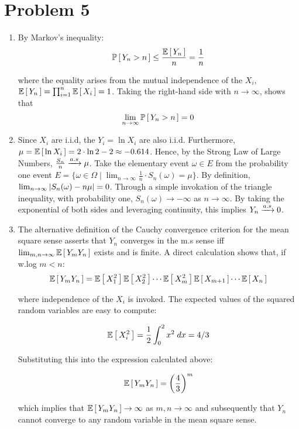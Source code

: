 \documentclass[12pt]{article}%
\begin{document}
\section{Problem 5}
\begin{enumerate}
  \item By Markov's inequality:
  \[ \mathbb{P}\left[\,Y_n > n\,\right] \leq \frac{\mathbb{E}\left[\,Y_n\,\right]}{n} = \frac{1}{n} \]

  where the equality arises from the mutual independence of the $X_i$, $\mathbb{E}\left[\,Y_n\,\right] = \prod_{i=1}^{n} \mathbb{E}\left[\,X_i\,\right] = 1$. Taking the right-hand side with $n \rightarrow \infty$, shows that
  \[ \lim_{n \rightarrow \infty} \mathbb{P}\left[\,Y_n > n\,\right] = 0  \]

  \item
  Since $X_i$ are i.i.d, the $Y_i = \ln{X_i}$ are also i.i.d. Furthermore, $\mu = \mathbb{E}\left[\,\ln{X_i}\,\right] = 2 \cdot \ln{2} - 2 \approx -0.614$. Hence, by the Strong Law of Large Numbers, $\frac{S_n}{n} \xrightarrow[]{a.s} \mu$. Take the elementary event $\omega \in E$ from the probability one event $E = \{\omega \in \Omega \mid \lim_{n \rightarrow \infty} \frac{1}{n}\cdot S_n(\omega) = \mu \}$. By definition, $\lim_{n \rightarrow \infty} \abs{S_n(\omega) - n\mu} = 0$. Through a simple invokation of the triangle inequality, with probability one, $S_n(\omega) \rightarrow -\infty$ as $n \rightarrow \infty$. By taking the exponential of both sides and leveraging continuity, this implies $Y_n \xrightarrow[]{a.s} 0$.

  \item
  The alternative definition of the Cauchy convergence criterion for the mean square sense asserts that $Y_n$ converges in the m.s sense iff $\lim_{m,n \rightarrow \infty} \mathbb{E}\left[\,Y_mY_n\,\right]$ exists and is finite. A direct calculation shows that, if w.log $m < n$:
  \begin{align*}
    \mathbb{E}\left[\,Y_mY_n\,\right] = \mathbb{E}\left[\,X^2_1\,\right]\mathbb{E}\left[\,X^2_2\,\right]\cdots \mathbb{E}\left[\,X^2_m\,\right]\mathbb{E}\left[\,X_{m+1}\,\right]\cdots \mathbb{E}\left[\,X_{n}\,\right]
  \end{align*}

  where independence of the $X_i$ is invoked. The expected values of the squared random variables are easy to compute:

  \[ \mathbb{E}\left[\,X^2_i\,\right] = \frac{1}{2}\int_{0}^2 x^2 \; dx  = 4/3 \]

  Substituting this into the expression calculated above:

  \[ \mathbb{E}\left[\,Y_mY_n\,\right] = \left(\frac{4}{3} \right)^m \]

  which implies that $\mathbb{E}\left[\,Y_mY_n\,\right] \rightarrow \infty$ as $m,n \rightarrow \infty$ and subsequently that $Y_n$ cannot converge to any random variable in the mean square sense.



\end{enumerate}
\end{document}
